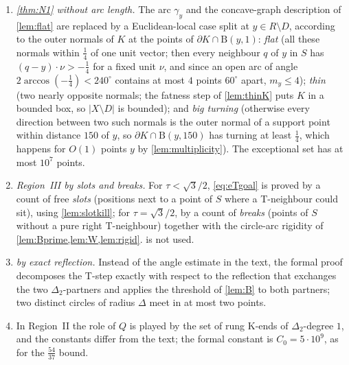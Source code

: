 \documentclass[11pt]{amsart}
\theoremstyle{definition}
\theoremstyle{remark}
\newcommand{\Dt}{\Delta_2}
\newcommand{\Dd}{\mathrm{B}}      %
\begin{document}
\begin{enumerate}[leftmargin=2em,label=(\alph*)]
\item \emph{\cref{thm:N1} without arc length.} The arc $\gamma_y$ and the concave-graph description of \cref{lem:flat} are replaced by a Euclidean-local case split at $y\in R\setminus D$, according to the outer normals of $K$ at the points of $\partial K\cap\Dd(y,1)$: \emph{flat} (all these normals within $\frac14$ of one unit vector; then every neighbour $q$ of $y$ in $S$ has $(q-y)\cdot\nu>-\frac14$ for a fixed unit $\nu$, and since an open arc of angle $2\arccos(-\frac14)<240^\circ$ contains at most $4$ points $60^\circ$ apart, $m_y\le4$); \emph{thin} (two nearly opposite normals; the fatness step of \cref{lem:thinK} puts $K$ in a bounded box, so $|X\setminus D|$ is bounded); and \emph{big turning} (otherwise every direction between two such normals is the outer normal of a support point within distance $150$ of $y$, so $\partial K\cap\Dd(y,150)$ has turning at least $\frac14$, which happens for $O(1)$ points $y$ by \cref{lem:multiplicity}). The exceptional set has at most $10^7$ points.
\item \emph{Region~III by slots and breaks.} For $\tau<\sqrt3/2$, \eqref{eq:eTgoal} is proved by a count of free \emph{slots} (positions next to a point of $S$ where a T-neighbour could sit), using \cref{lem:slotkill}; for $\tau=\sqrt3/2$, by a count of \emph{breaks} (points of $S$ without a pure right T-neighbour) together with the circle-arc rigidity of \cref{lem:Bprime,lem:W,lem:rigid}.  is not used.
\item \emph{ by exact reflection.} Instead of the angle estimate in the text, the formal proof decomposes the T-step exactly with respect to the reflection that exchanges the two $\Dt$-partners and applies the threshold of \cref{lem:B} to both partners; two distinct circles of radius $\Delta$ meet in at most two points.
\item In Region~II the role of $Q$ is played by the set of rung K-ends of $\Dt$-degree $1$, and the constants differ from the text; the formal constant is $C_0=5\cdot10^9$, as for the $\frac{54}{37}$ bound.
\end{enumerate}
\end{document}
